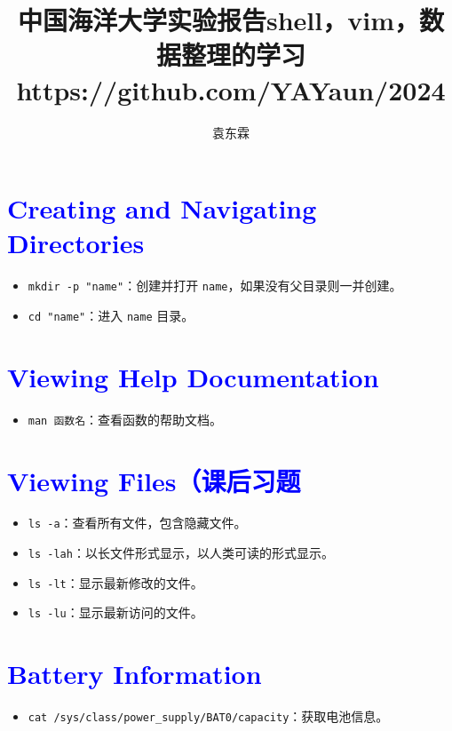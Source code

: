 \documentclass{article}
\begin{document}
\title{中国海洋大学实验报告}
\maketitle
\title{shell，vim，数据整理的学习\\https://github.com/YAYaun/2024\\}
\author{袁东霖}
\maketitle
\section{\textcolor{blue}{Creating and Navigating Directories}}
\begin{itemize}
    \item \texttt{mkdir -p "name"}：创建并打开 \texttt{name}，如果没有父目录则一并创建。
    \item \texttt{cd "name"}：进入 \texttt{name} 目录。
\end{itemize}

\section{\textcolor{blue}{Viewing Help Documentation}}
\begin{itemize}
    \item \texttt{man 函数名}：查看函数的帮助文档。
\end{itemize}

\section{\textcolor{blue}{Viewing Files（课后习题}}
\begin{itemize}
    \item \texttt{ls -a}：查看所有文件，包含隐藏文件。
    \item \texttt{ls -lah}：以长文件形式显示，以人类可读的形式显示。
    \item \texttt{ls -lt}：显示最新修改的文件。
    \item \texttt{ls -lu}：显示最新访问的文件。
\end{itemize}

\section{\textcolor{blue}{Battery Information}}
\begin{itemize}
    \item \texttt{cat /sys/class/power\_supply/BAT0/capacity}：获取电池信息。
\end{itemize}
\end{document}
